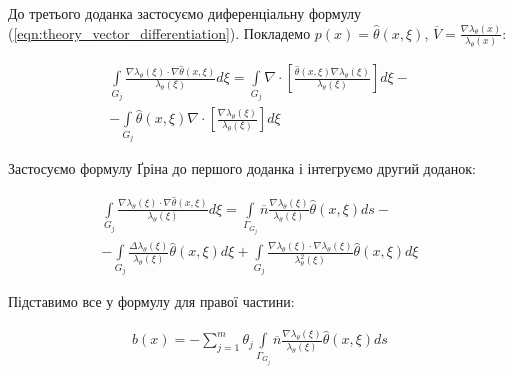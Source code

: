 \noindent До третього доданка застосуємо диференціальну формулу (\ref{eqn:theory_vector_differentiation}). Покладемо
$p(x) = \hat{\theta}(x, \xi)$, $\overline{V} = \frac{\nabla \lambda_{\theta}(x)}{\lambda_{\theta}(x)}$:

\begin{equation}
    \begin{split}
        \int \limits_{G_j} \frac{\nabla \lambda_{\theta}(\xi) \cdot \nabla \hat{\theta}(x, \xi)} 
            {\lambda_{\theta}(\xi)} d \xi = 
        \int \limits_{G_j} \nabla \cdot \left[\frac{\hat{\theta}(x, \xi) \nabla \lambda_{\theta}(\xi)}
            {\lambda_{\theta}(\xi)} \right] d \xi - \\ 
        - 
        \int \limits_{G_j} \hat{\theta}(x, \xi) \nabla \cdot \left[ \frac{\nabla \lambda_{\theta}(\xi)}
            {\lambda_{\theta}(\xi)} \right] d \xi
    \end{split}
\end{equation}

\noindent Застосуємо формулу Ґріна до першого доданка і інтегруємо другий доданок:

\begin{equation}
    \begin{split}
        \int \limits_{G_j} \frac{\nabla \lambda_{\theta}(\xi) \cdot \nabla \hat{\theta}(x, \xi)} 
            {\lambda_{\theta}(\xi)} d \xi = 
        \int \limits_{\Gamma_{G_j}} \overline{n} \frac{\nabla \lambda_{\theta}(\xi)}
            {\lambda_{\theta}(\xi)} \hat{\theta}(x, \xi) ds - \\ 
        - 
        \int \limits_{G_j} \frac{\Delta \lambda_{\theta}(\xi)}{\lambda_{\theta}(\xi)} \hat{\theta}(x, \xi)  d \xi
        + 
        \int \limits_{G_j} \frac{\nabla \lambda_{\theta}(\xi) \cdot \nabla \lambda_{\theta}(\xi)}
            {\lambda_{\theta}^2(\xi)} \hat{\theta}(x, \xi) d \xi
        \end{split}
\end{equation}

\noindent Підставимо все у формулу для правої частини:

\begin{equation}
    \begin{split}
        b(x) =  - \sum_{j=1}^{m} \theta_j \int \limits_{\Gamma_{G_j}} \overline{n} \frac{\nabla \lambda_{\theta}(\xi)}
        {\lambda_{\theta}(\xi)} \hat{\theta}(x, \xi) ds
    \end{split}
\end{equation}

